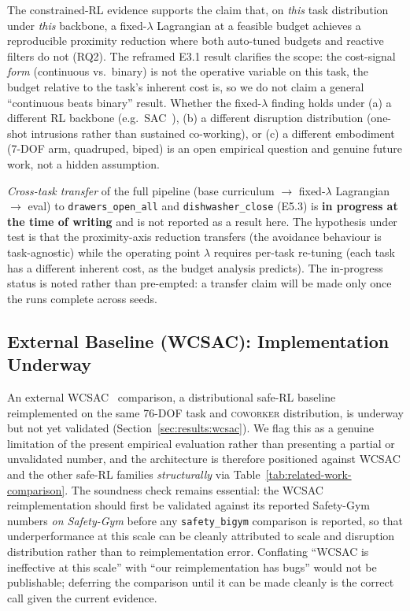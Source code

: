 \documentclass[11pt,a4paper]{report}
\newcommand{\sbigym}{\texttt{safety\_bigym}}
\newcommand{\coworker}{\textsc{coworker}}
\begin{document}
The constrained-RL evidence supports the claim that, on \emph{this}
task distribution under \emph{this} backbone, a fixed-$\lambda$
Lagrangian at a feasible budget achieves a reproducible proximity
reduction where both auto-tuned budgets and reactive filters do not
(RQ2). The reframed E3.1 result clarifies the scope: the cost-signal
\emph{form} (continuous vs.\ binary) is not the operative variable on
this task, the budget relative to the task's inherent cost is, so we do
not claim a general ``continuous beats binary'' result. Whether the
fixed-$\lambda$ finding holds under (a) a different RL backbone
(e.g.\ SAC~\cite{yang2021wcsac}), (b) a different disruption
distribution (one-shot intrusions rather than sustained co-working),
or (c) a different embodiment (7-DOF arm, quadruped, biped) is an open
empirical question and genuine future work, not a hidden assumption.

\emph{Cross-task transfer} of the full pipeline (base curriculum
$\rightarrow$ fixed-$\lambda$ Lagrangian $\rightarrow$ eval) to
\texttt{drawers\_open\_all} and \texttt{dishwasher\_close} (E5.3) is
\textbf{in progress at the time of writing} and is not reported as a
result here. The hypothesis under test is that the proximity-axis
reduction transfers (the avoidance behaviour is task-agnostic) while
the operating point $\lambda$ requires per-task re-tuning (each task
has a different inherent cost, as the budget analysis predicts). The
in-progress status is noted rather than pre-empted: a transfer claim
will be made only once the runs complete across seeds.

\subsection{External Baseline (WCSAC): Implementation Underway}
\label{sec:disc:wcsac-honest}

An external WCSAC~\cite{yang2021wcsac} comparison, a distributional
safe-RL baseline reimplemented on the same 76-DOF task and
\coworker{} distribution, is underway but not yet validated
(Section~\ref{sec:results:wcsac}). We flag this as a genuine limitation
of the present empirical evaluation rather than presenting a partial or
unvalidated number, and the architecture is therefore positioned against
WCSAC and the other safe-RL families \emph{structurally} via
Table~\ref{tab:related-work-comparison}. The soundness check remains
essential: the WCSAC reimplementation should first be validated
against its reported Safety-Gym numbers \emph{on Safety-Gym} before any
\sbigym{} comparison is reported, so that underperformance at this scale
can be cleanly attributed to scale and disruption distribution rather
than to reimplementation error. Conflating ``WCSAC is ineffective at
this scale'' with ``our reimplementation has bugs'' would not be
publishable; deferring the comparison until it can be made cleanly is
the correct call given the current evidence.
\end{document}
